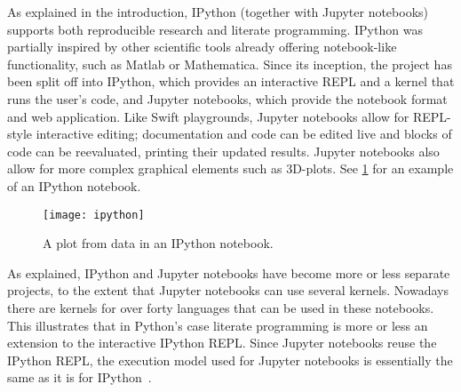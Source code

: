 As explained in the introduction, IPython (together with Jupyter notebooks)
supports both reproducible research and literate programming. IPython was
partially inspired by other scientific tools already offering notebook-like
functionality, such as Matlab or Mathematica. Since its inception, the project
has been split off into IPython, which provides an interactive REPL and a
kernel that runs the user's code, and Jupyter notebooks, which provide the
notebook format and web application. Like Swift playgrounds, Jupyter notebooks
allow for REPL-style interactive editing; documentation and code can be edited
live and blocks of code can be reevaluated, printing their updated results.
Jupyter notebooks also allow for more complex graphical elements such as
3D-plots. See \cref{fig:ipython} for an example of an IPython notebook.

\begin{figure}[htb]
  \centering
  \texttt{[image: ipython]}
  \caption{A plot from data in an IPython notebook.}
  \label{fig:ipython}
\end{figure}

As explained, IPython and Jupyter notebooks have become more or less separate
projects, to the extent that Jupyter notebooks can use several kernels.
Nowadays there are kernels for over forty languages that can be used in these
notebooks. This illustrates that in Python's case literate programming is more
or less an extension to the interactive IPython REPL. Since Jupyter notebooks
reuse the IPython REPL, the execution model used for Jupyter notebooks is
essentially the same as it is for IPython~\cite{ipython-execution}.


